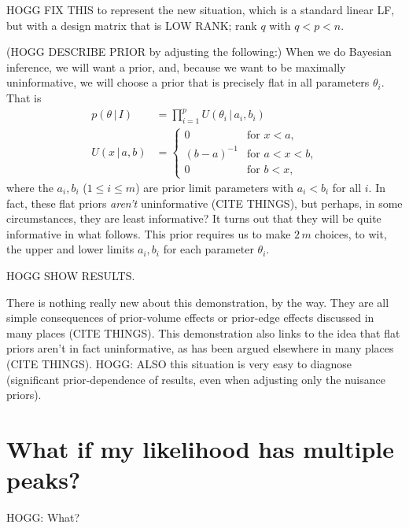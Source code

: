 \documentclass{article}
\newcommand{\given}{\,|\,}
\begin{document}
HOGG FIX THIS to represent the new situation, which is a standard linear LF, but with a design matrix that is LOW RANK; rank $q$ with $q<p<n$.

(HOGG DESCRIBE PRIOR by adjusting the following:)
When we do Bayesian inference, we will want a prior, and, because we want to be maximally uninformative, we will choose a prior that is precisely flat in all parameters $\theta_i$.
That is
\begin{align}
    p(\theta\given I) &= \prod_{i=1}^p U(\theta_i\given a_i, b_i) \\
    U(x\given a, b) & = \left\{\begin{array}{cl}
    0 & \mbox{for $x<a$,} \\
    (b-a)^{-1} & \mbox{for $a<x<b$,} \\
    0 & \mbox{for $b<x$,}\end{array}\right.
\end{align}
where the $a_i, b_i$ ($1\leq i\leq m$) are prior limit parameters with $a_i<b_i$ for all $i$.
In fact, these flat priors \emph{aren't} uninformative (CITE THINGS), but perhaps, in some circumstances, they are least informative?
It turns out that they will be quite informative in what follows.
This prior requires us to make $2\,m$ choices, to wit, the upper and lower limits $a_i, b_i$ for each parameter $\theta_i$.

HOGG SHOW RESULTS.

There is nothing really new about this demonstration, by the way.
They are all simple consequences of prior-volume effects or prior-edge effects discussed in many places (CITE THINGS).
This demonstration also links to the idea that flat priors aren't in fact uninformative, as has been argued elsewhere in many places (CITE THINGS).
HOGG: ALSO this situation is very easy to diagnose (significant prior-dependence of results, even when adjusting only the nuisance priors).

\section{What if my likelihood has multiple peaks?}\label{sec:multiple}
HOGG: What?
\end{document}
